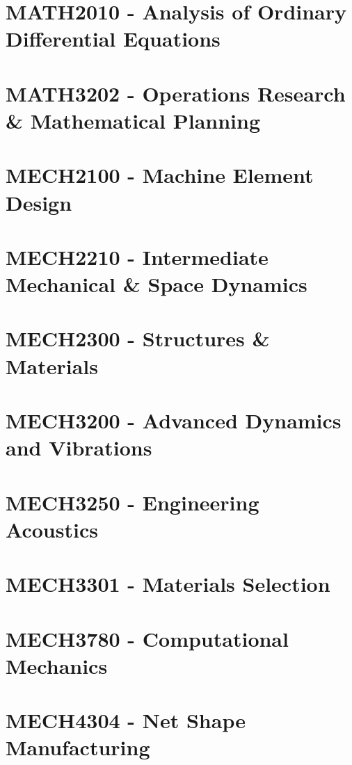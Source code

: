 \documentclass[a4paper,12pt]{report}
\begin{document}
\hypertarget{MATH2010}{\section{MATH2010 - Analysis of Ordinary Differential Equations}}

\hypertarget{MATH3202}{\section{MATH3202 - Operations Research \& Mathematical Planning}}

\hypertarget{MECH2100}{\section{MECH2100 - Machine Element Design}}

\hypertarget{MECH2210}{\section{MECH2210 - Intermediate Mechanical \& Space Dynamics}}

\hypertarget{MECH2300}{\section{MECH2300 - Structures \& Materials}}

\hypertarget{MECH3200}{\section{MECH3200 - Advanced Dynamics and Vibrations}}

\hypertarget{MECH3250}{\section{MECH3250 - Engineering Acoustics}}

\hypertarget{MECH3301}{\section{MECH3301 - Materials Selection}}

\hypertarget{MECH3780}{\section{MECH3780 - Computational Mechanics}}

\hypertarget{MECH4304}{\section{MECH4304 - Net Shape Manufacturing}}
\end{document}
